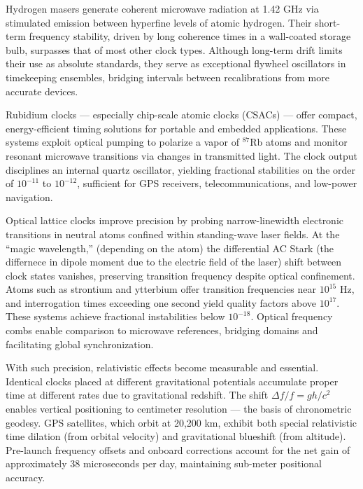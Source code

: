Hydrogen masers generate coherent microwave radiation at 1.42 GHz via stimulated emission between hyperfine levels of atomic hydrogen. Their short-term frequency stability, driven by long coherence times in a wall-coated storage bulb, surpasses that of most other clock types. Although long-term drift limits their use as absolute standards, they serve as exceptional flywheel oscillators in timekeeping ensembles, bridging intervals between recalibrations from more accurate devices.

Rubidium clocks — especially chip-scale atomic clocks (CSACs) — offer compact, energy-efficient timing solutions for portable and embedded applications. These systems exploit optical pumping to polarize a vapor of $^{87}$Rb atoms and monitor resonant microwave transitions via changes in transmitted light. The clock output disciplines an internal quartz oscillator, yielding fractional stabilities on the order of $10^{-11}$ to $10^{-12}$, sufficient for GPS receivers, telecommunications, and low-power navigation.

Optical lattice clocks improve precision by probing narrow-linewidth electronic transitions in neutral atoms confined within standing-wave laser fields. At the “magic wavelength,” (depending on the atom) the differential AC Stark (the differnece in dipole moment due to the electric field of the laser) shift between clock states vanishes, preserving transition frequency despite optical confinement. Atoms such as strontium and ytterbium offer transition frequencies near $10^{15}$ Hz, and interrogation times exceeding one second yield quality factors above $10^{17}$. These systems achieve fractional instabilities below $10^{-18}$. Optical frequency combs enable comparison to microwave references, bridging domains and facilitating global synchronization.

With such precision, relativistic effects become measurable and essential. Identical clocks placed at different gravitational potentials accumulate proper time at different rates due to gravitational redshift. The shift $\Delta f/f = gh/c^2$ enables vertical positioning to centimeter resolution — the basis of chronometric geodesy. GPS satellites, which orbit at 20,200 km, exhibit both special relativistic time dilation (from orbital velocity) and gravitational blueshift (from altitude). Pre-launch frequency offsets and onboard corrections account for the net gain of approximately 38 microseconds per day, maintaining sub-meter positional accuracy.

